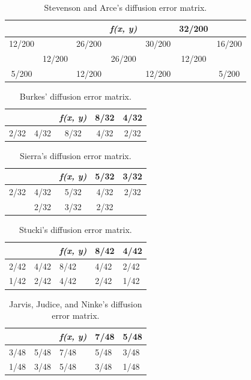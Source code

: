 \documentclass[conference]{IEEEtran}
\begin{document}
\begin{table}[!h]
\centering
\renewcommand{\arraystretch}{1.5}
\begin{tabular}{c|c|c|c|c|c|c}
 & \textit{} &  & \textit{f(x, y)} &  & 32/200 &  \\ \hline
12/200 &  & 26/200 &  & 30/200 &  & 16/200 \\ \hline
 & 12/200 &  & 26/200 &  & 12/200 &  \\ \hline
5/200 &  & 12/200 &  & 12/200 &  & 5/200
\end{tabular}
\caption{Stevenson and Arce's diffusion error matrix.}
\label{tab:ste}
\end{table}

\begin{table}[!h]
\centering
\renewcommand{\arraystretch}{1.5}
\begin{tabular}{c|c|c|c|c}
 &  & \textit{f(x, y)} & 8/32 & 4/32 \\ \hline
2/32 & 4/32 & 8/32 & 4/32 & 2/32
\end{tabular}
\caption{Burkes' diffusion error matrix.}
\label{tab:bur}
\end{table}

\begin{table}[!h]
\centering
\renewcommand{\arraystretch}{1.5}
\begin{tabular}{c|c|c|c|c}
 &  & \textit{f(x, y)} & 5/32 & 3/32 \\ \hline
2/32 & 4/32 & 5/32 & 4/32 & 2/32 \\ \hline
 & 2/32 & 3/32 & 2/32 & 
\end{tabular}
\caption{Sierra's diffusion error matrix.}
\label{tab:sie}
\end{table}

\begin{table}[!h]
\centering
\renewcommand{\arraystretch}{1.5}
\begin{tabular}{l|l|l|l|l}
 &  & \textit{f(x, y)} & 8/42 & 4/42 \\ \hline
2/42 & 4/42 & 8/42 & 4/42 & 2/42 \\ \hline
1/42 & 2/42 & 4/42 & 2/42 & 1/42
\end{tabular}
\caption{Stucki's diffusion error matrix.}
\label{tab:stu}
\end{table}

\begin{table}[!h]
\centering
\renewcommand{\arraystretch}{1.5}
\begin{tabular}{l|l|l|l|l}
 &  & \textit{f(x, y)} & 7/48 & 5/48 \\ \hline
3/48 & 5/48 & 7/48 & 5/48 & 3/48 \\ \hline
1/48 & 3/48 & 5/48 & 3/48 & 1/48
\end{tabular}
\caption{Jarvis, Judice, and Ninke's diffusion error matrix.}
\label{tab:jar}
\end{table}
\end{document}
